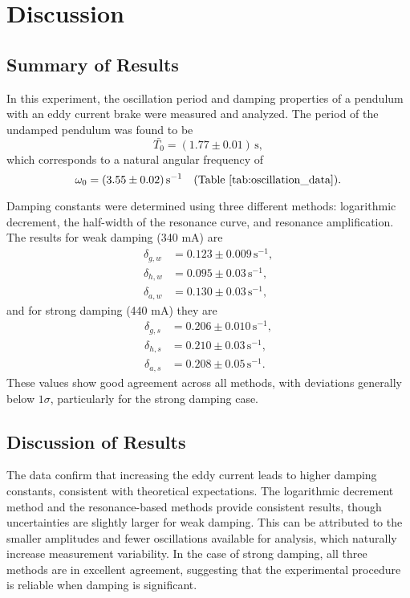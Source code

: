 \chapter{Discussion}

\section*{Summary of Results}
In this experiment, the oscillation period and damping properties of a pendulum with an eddy current brake were measured and analyzed. The period of the undamped pendulum was found to be 
\[
    \bar{T_0} = (1.77 \pm 0.01)\,\mathrm{s},
\] 
which corresponds to a natural angular frequency of 
\[
    \omega_0 = (3.55 \pm 0.02)\,\mathrm{s}^{-1} \quad (\text{Table \ref{tab:oscillation_data}}).
\] 

Damping constants were determined using three different methods: logarithmic decrement, the half-width of the resonance curve, and resonance amplification. The results for weak damping (340 mA) are
\begin{align*}
    \delta_{g,w} &= 0.123 \pm 0.009 \,\text{s}^{-1}, \\
    \delta_{h,w} &= 0.095 \pm 0.03 \,\text{s}^{-1}, \\
    \delta_{a,w} &= 0.130 \pm 0.03 \,\text{s}^{-1},
\end{align*}
and for strong damping (440 mA) they are
\begin{align*}
    \delta_{g,s} &= 0.206 \pm 0.010 \,\text{s}^{-1}, \\ 
    \delta_{h,s} &= 0.210 \pm 0.03 \,\text{s}^{-1}, \\
    \delta_{a,s} &= 0.208 \pm 0.05 \,\text{s}^{-1}.
\end{align*}
These values show good agreement across all methods, with deviations generally below $1\sigma$, particularly for the strong damping case.

\section*{Discussion of Results}
The data confirm that increasing the eddy current leads to higher damping constants, consistent with theoretical expectations. The logarithmic decrement method and the resonance-based methods provide consistent results, though uncertainties are slightly larger for weak damping. This can be attributed to the smaller amplitudes and fewer oscillations available for analysis, which naturally increase measurement variability. In the case of strong damping, all three methods are in excellent agreement, suggesting that the experimental procedure is reliable when damping is significant. 

